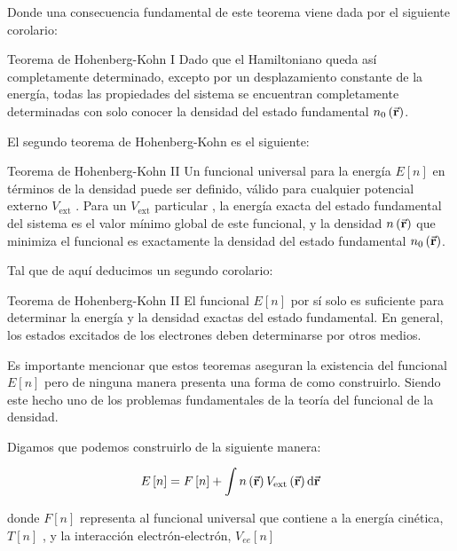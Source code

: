   Donde una consecuencia fundamental de este teorema viene dada por el siguiente corolario:

  \begin{mycoro}{Teorema de Hohenberg-Kohn I}{}
    Dado que el Hamiltoniano queda así completamente determinado, excepto por un desplazamiento constante de la energía, todas las propiedades del sistema se encuentran completamente determinadas con solo conocer la densidad del estado fundamental $n_0 \left( \va{r} \right)$.
\end{mycoro}

El segundo teorema de Hohenberg-Kohn es el siguiente:


\begin{mytheo}{Teorema de Hohenberg-Kohn II}{}
    Un funcional universal para la energía $E \left[ n \right]$ en términos de la densidad puede ser definido, válido para cualquier potencial externo $V_{\text{ext}}$ . Para un  $V_{\text{ext}}$ particular , la energía exacta del estado fundamental del sistema es el valor mínimo global de este funcional, y la densidad $n \left( \va{r} \right)$ que minimiza el funcional es exactamente la densidad del estado fundamental $n_0 \left( \va{r} \right)$.
\end{mytheo}

Tal que de aquí deducimos un segundo corolario:

\begin{mycoro}{Teorema de Hohenberg-Kohn II}{}
    El funcional $E \left[ n \right]$ por sí solo es suficiente para determinar la energía y la densidad exactas del estado fundamental. En general, los estados excitados de los electrones deben determinarse por otros medios.
\end{mycoro}

Es importante mencionar que estos teoremas aseguran la existencia del funcional $E \left[ n \right]$ pero de ninguna manera presenta una forma de como construirlo. Siendo este hecho uno de los problemas fundamentales de la teoría del funcional de la densidad.

Digamos que podemos construirlo de la siguiente manera: 

\begin{equation}
    E \left[ n \right] = F \left[ n \right] + \int n \left( \va{r} \right) V_{\text{ext}} \left( \va{r} \right) \dd{\va{r}}
\end{equation}

donde $F \left[ n \right]$ representa al funcional universal que contiene a la energía cinética, $ T \left[ n \right] $ , y la interacción electrón-electrón,  $ V_{ee} \left[ n \right] $


